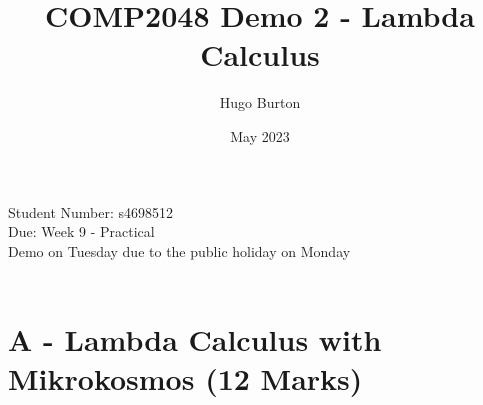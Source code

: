 \documentclass{article}
\title{COMP2048 Demo 2 - Lambda Calculus}
\author{Hugo Burton}
\date{May 2023}
\begin{document}
\maketitle

\newcommand{\EE}{\mathbb{E}}
\newcommand{\PP}{\mathbb{P}}
\newcommand{\cc}{^{\mathsf{c}}}
\newcommand{\E}{\ensuremath{\mathbb{E}}}
\newcommand{\I}{\ensuremath{\mathbb{I}}}
\newcommand{\R}{\ensuremath{\mathbb{R}}}
\newcommand{\N}{\ensuremath{\mathbb{N}}}
\newcommand{\pr}{\ensuremath{\mathbb{P}}}
\newcommand{\scriptN}{\mathcal{N}}
\newcommand{\scriptI}{\mathcal{I}}


Student Number: s4698512\\
Due: Week 9 - Practical\\
Demo on Tuesday due to the public holiday on Monday
\\
\\

\section{A - Lambda Calculus with Mikrokosmos (12 Marks)}
\end{document}
